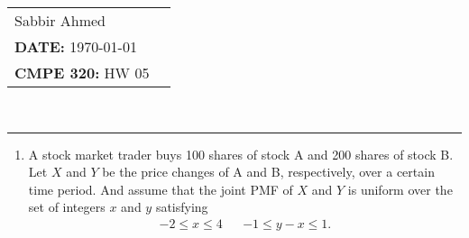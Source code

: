 \documentclass[paper=usletter, fontsize=12pt]{article}
\newcommand{\documentinfo}[5]{
    \begin{centering}
        \parbox{2in}{
        \begin{spacing}{1}
            \begin{flushleft}
                \begin{tabular}{l l}
                    #1 \\
                    #2 \\
                    #3 \\
                \end{tabular}\\
                \rule{\textwidth}{1pt}
            \end{flushleft}
        \end{spacing}
        }
    \end{centering}
}
\begin{document}
    \documentinfo{Sabbir Ahmed}{\textbf{DATE:} \today}{\textbf{CMPE 320:} HW 05}
    \vspace{-0.2in}

    \begin{enumerate}[label=\textbf{\arabic*}.]

        \item
        A stock market trader buys 100 shares of stock A and 200 shares of
        stock B. Let $X$ and $Y$ be the price changes of A and B, respectively,
        over a certain time period. And assume that the joint PMF of $X$ and
        $Y$ is uniform over the set of integers $x$ and $y$ satisfying
        \begin{align*}
            -2 \le x \le 4 && -1 \le y-x \le 1.
        \end{align*}
        \begin{enumerate}[label=(\alph*)]


\end{enumerate}
\end{enumerate}
\end{document}
